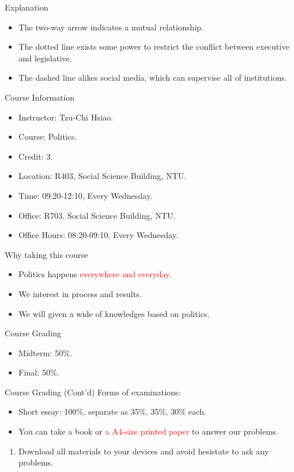 \documentclass{beamer}
\begin{document}
\begin{frame}{Explanation}
\begin{itemize}
\item The two-way arrow indicates a mutual relationship.
\item The dotted line exists some power to restrict the conflict between executive and legislative.
\item The dashed line alikes social media, which can supervise all of institutions.
\end{itemize}
\end{frame}
\begin{frame}{Course Information}
\begin{itemize}
\item Instructor: Tzu-Chi Hsiao.
\item Course: Politics.
\item Credit: 3.
\item Location: R403, Social Science Building, NTU.
\item Time: 09:20-12:10, Every Wednesday.
\item Office: R703, Social Science Building, NTU.
\item Office Hours: 08:20-09:10, Every Wednesday.
\end{itemize}
\end{frame}
\begin{frame}{Why taking this course}
\begin{itemize}
\item Politics happens \textcolor{red}{everywhere and everyday}.
\item We interest in process and results.
\item We will given a wide of knowledges based on politics.
\end{itemize}
\end{frame}
\begin{frame}{Course Grading}
\begin{itemize}
\item Midterm: 50\%.
\item Final: 50\%.
\end{itemize}
\end{frame}
\begin{frame}{Course Grading (Cont'd)}
Forms of examinations:
\begin{itemize}
\item Short essay: 100\%, separate as 35\%, 35\%, 30\% each.
\item You can take a book or \textcolor{red}{a A4-size printed paper} to answer our problems.
\end{itemize}
\begin{enumerate}
\item Download all materials to your devices and avoid hesistate to ask any problems.
\end{enumerate}
\end{frame}
\end{document}

